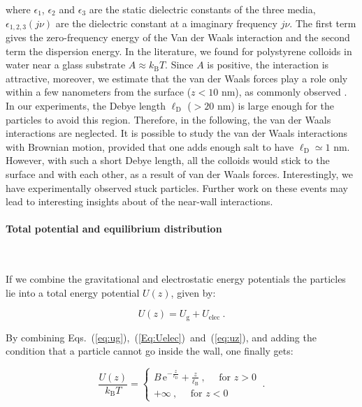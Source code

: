 where $\epsilon_1$, $\epsilon_2$ and $\epsilon_3$ are the static dielectric constants of the three media, $\epsilon_{1,2,3} (j\nu)$ are the  dielectric constant at a imaginary frequency $ j \nu$. The first term gives the zero-frequency energy of the Van der Waals interaction and the second term the dispersion energy. In the literature, we found for polystyrene colloids in water near a glass substrate $A\approx k_\mathrm{B}T$. Since $A$ is positive, the interaction is attractive, moreover, we estimate that the van der Waals forces play a role only within a few nanometers from the surface ($z < 10$ nm), as commonly observed \cite{prieve_measurement_1999}. In our experiments, the Debye length $\ell _\mathrm{D}$ ($>20$ nm) is large enough for the particles to avoid this region. Therefore, in the following, the van der Waals interactions are neglected. It is possible to study the van der Waals interactions with Brownian motion, provided that one adds enough salt to have $\ell_\mathrm{D} \simeq 1$ nm. However, with such a short Debye length, all the colloids would stick to the surface and with each other, as a result of van der Waals forces. Interestingly, we have experimentally observed stuck particles. Further work on these events may lead to interesting insights about of the near-wall interactions. 



\paragraph{Total potential and equilibrium distribution}\mbox{}\\
\label{test}
\vspace{0.10cm}

If we combine the gravitational and electrostatic energy potentials the particles lie into a total energy potential $U(z)$, given by:

\begin{equation}
	U(z) = U_\mathrm{g} + U_\mathrm{elec}~.
	\label{eq:uz}
\end{equation}

By combining Eqs.~(\ref{eq:ug}),~(\ref{Eq:Uelec})~and~(\ref{eq:uz}), and adding the condition that a particle cannot go inside the wall, one finally gets:

\begin{equation}
	\frac{U(z)}{k_\mathrm{B}T} =  \left\{
	\begin{array}{l}
		\displaystyle B\,\textrm{e}^{-\frac{z}{\ell_\mathrm{D}}} + \frac{z}{\ell_\mathrm{B}}\ ,\quad \text{ for } z>0 \\
		+\infty\ ,\quad  \text{ for } z < 0
	\end{array}
	\right. \ .
	\label{Eq:PDF}
\end{equation}

